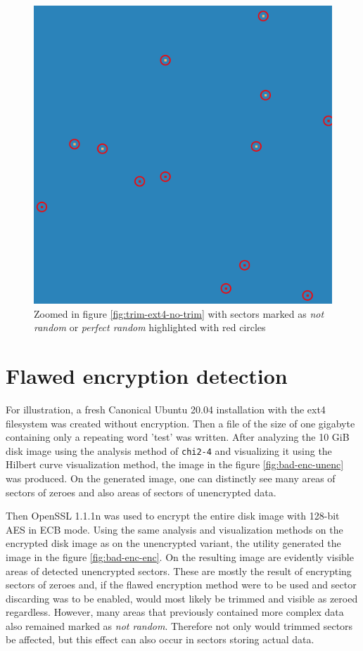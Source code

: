 \documentclass[
  digital, %
  color,   %
  oneside, %
  lof,     %
  nolot,     %
]{fithesis4}
\begin{document}
\begin{figure}
    \centering
    \includegraphics[width=.95\textwidth,interpolate=false]{test-ext4-no-trim-chi2-4-sweeping-zoomed.png}
    \caption{Zoomed in figure \ref{fig:trim-ext4-no-trim} with sectors marked as \emph{not random} or \emph{perfect random} highlighted with red circles}
    \label{fig:trim-zoomed}
\end{figure}

\section{Flawed encryption detection}
\label{sec:flawed-encryption}

For illustration, a fresh Canonical Ubuntu 20.04\cite{ubuntu} installation with the ext4 filesystem was created without encryption.
Then a file of the size of one gigabyte containing only a repeating word 'test' was written.
After analyzing the 10 GiB disk image using the analysis method of \texttt{chi2-4} and visualizing it using the Hilbert curve visualization method, the image in the figure \ref{fig:bad-enc-unenc} was produced.
On the generated image, one can distinctly see many areas of sectors of zeroes and also areas of sectors of unencrypted data.

Then OpenSSL 1.1.1n\cite{openssl} was used to encrypt the entire disk image with 128-bit AES in ECB mode.
Using the same analysis and visualization methods on the encrypted disk image as on the unencrypted variant, the utility generated the image in the figure \ref{fig:bad-enc-enc}.
On the resulting image are evidently visible areas of detected unencrypted sectors.
These are mostly the result of encrypting sectors of zeroes and, if the flawed encryption method were to be used and sector discarding was to be enabled, would most likely be trimmed and visible as zeroed regardless.
However, many areas that previously contained more complex data also remained marked as \emph{not random}.
Therefore not only would trimmed sectors be affected, but this effect can also occur in sectors storing actual data.
\end{document}
